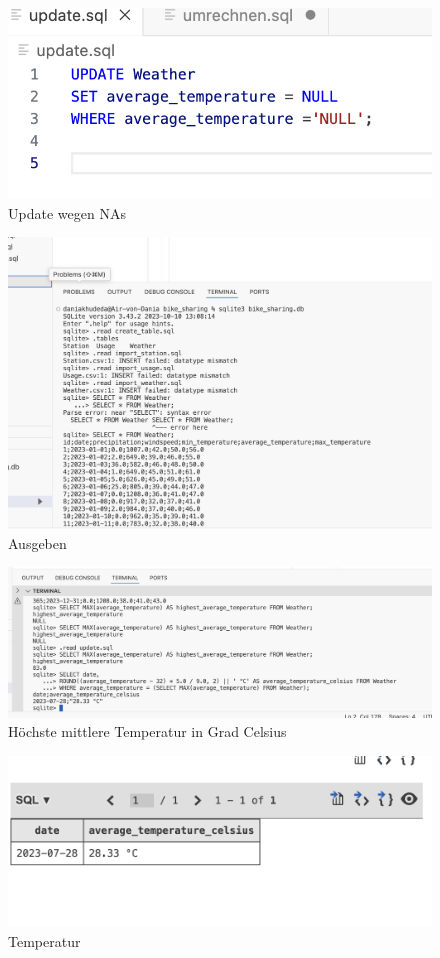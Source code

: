 \documentclass{article}
\begin{document}
\begin{figure} [h]
    \centering
    \includegraphics[width=0.6\linewidth]{update NAs.png}
    \caption{Update wegen NAs}
    \label{fig:SQL-Code4}
\end{figure}

\begin{figure}[h]
    \centering
    \includegraphics[width=0.7\linewidth]{Ausgeben.png}
    \caption{Ausgeben}
    \label{fig:Daten abrufen}
\end{figure}
\begin{figure} [h]
    \centering
    \includegraphics[width=1\linewidth]{Abfrage Temperatur.png}
    \caption{Höchste mittlere Temperatur in Grad Celsius}
    \label{fig:Abfrage}
\end{figure}
\begin{figure}
    \centering
    \includegraphics[width=0.5\linewidth]{Abfrage Bild.png}
    \caption{Temperatur}
    \label{fig:Temperatur}
\end{figure}
\end{document}
